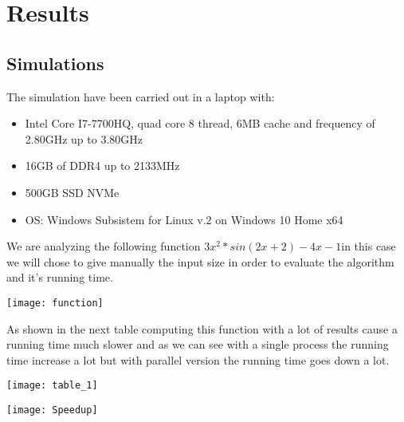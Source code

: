 \documentclass[a4paper,11pt,oneside]{book}
\begin{document}
\chapter*{Results}

\section*{Simulations}
The simulation have been carried out in a laptop with:
\begin{itemize}
	\item Intel Core I7-7700HQ, quad core 8 thread, 6MB cache and frequency of 2.80GHz up to 3.80GHz
	\item 16GB of DDR4 up to 2133MHz
	\item 500GB SSD NVMe
	\item OS: Windows Subsistem for Linux v.2 on Windows 10 Home x64
\end{itemize}


We are analyzing the following function $3x^2*sin(2x+2)-4x-1$in this case we will chose to give manually the input size in order to evaluate the algorithm and it's running time.


\begin{center}
\texttt{[image: function]}
\end{center}


As shown in the next table computing this function with a lot of results cause a running time much slower and as we can see with a single process the running time increase a lot but with parallel version the running time goes down a lot.

\begin{center}
\texttt{[image: table\_1]}
\end{center}

\begin{center}
\texttt{[image: Speedup]}
\end{center}
\end{document}
